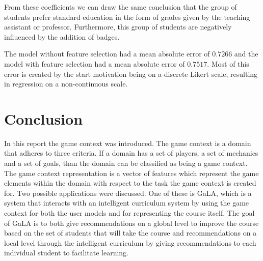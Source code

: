 \documentclass[11pt]{article}
\begin{document}
From these coefficients we can draw the same conclusion that the group of students prefer standard education in the form of grades given by the teaching assistant or professor. Furthermore, this group of students are negatively influenced by the addition of badges.

The model without feature selection had a mean absolute error of $0.7266$ and the model with feature selection had a mean absolute error of $0.7517$. Most of this error is created by the start motivation being on a discrete Likert scale, resulting in regression on a non-continuous scale.


% 


\section{Conclusion}\label{sec:conclusion}
In this report the game context was introduced. The game context is a domain that adheres to three criteria. If a domain has a set of players, a set of mechanics and a set of goals, than the domain can be classified as being a game context. The game context representation is a vector of features which represent the game elements within the domain with respect to the task the game context is created for. Two possible applications were discussed. One of these is GaLA, which is a system that interacts with an intelligent curriculum system by using the game context for both the user models and for representing the course itself. The goal of GaLA is to both give recommendations on a global level to improve the course based on the set of students that will take the course and recommendations on a local level through the intelligent curriculum by giving recommendations to each individual student to facilitate learning.
\end{document}
